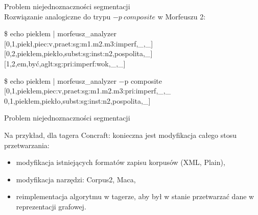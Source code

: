 \documentclass{beamer}
\begin{document}
\begin{frame}{Problem niejednoznaczności segmentacji}
  \\
  Rozwiązanie analogiczne do trypu $-p\ composite$ w Morfeuszu 2:
  \vspace{0.5cm}

  \$ echo piekłem | morfeusz\_analyzer\\
  {[}0,1,piekł,piec:v,praet:sg:m1.m2.m3:imperf,\_,\_{]}\\
  {[}0,2,piekłem,piekło,subst:sg:inst:n2,pospolita,\_{]}\\
  {[}1,2,em,być,aglt:sg:pri:imperf:wok,\_,\_{]}\\
  \vspace{0.5cm}

  \$ echo piekłem | morfeusz\_analyzer $-$p composite\\
  {[}0,1,piekłem,piec:v,praet:sg:m1.m2.m3:pri:imperf,\_,\_
  0,1,piekłem,piekło,subst:sg:inst:n2,pospolita,\_{]}
\end{frame}

\begin{frame}{Problem niejednoznaczności segmentacji}
  \vspace{0.5cm}

  Na przykład, dla tagera Concraft: konieczna jest modyfikacja całego stosu przetwarzania:
  \begin{itemize}
    \item modyfikacja istniejących formatów zapisu korpusów (XML, Plain),
    \item modyfikacja narzędzi: Corpus2, Maca,
    \item reimplementacja algorytmu w tagerze, aby był w stanie przetwarzać dane w reprezentacji grafowej.
  \end{itemize}
\end{frame}
\end{document}
